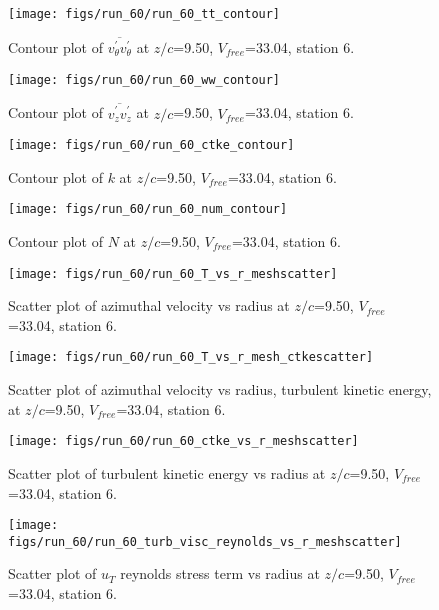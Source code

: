 \begin{figure}[H]
\centering
\texttt{[image: figs/run\_60/run\_60\_tt\_contour]}
\caption{Contour plot of $\overline{v_{\theta}^{\prime} v_{\theta}^{\prime}}$ at $z/c$=9.50, $V_{free}$=33.04, station 6.}
\end{figure}


\begin{figure}[H]
\centering
\texttt{[image: figs/run\_60/run\_60\_ww\_contour]}
\caption{Contour plot of $\overline{v_{z}^{\prime} v_{z}^{\prime}}$ at $z/c$=9.50, $V_{free}$=33.04, station 6.}
\end{figure}


\begin{figure}[H]
\centering
\texttt{[image: figs/run\_60/run\_60\_ctke\_contour]}
\caption{Contour plot of $k$ at $z/c$=9.50, $V_{free}$=33.04, station 6.}
\end{figure}


\begin{figure}[H]
\centering
\texttt{[image: figs/run\_60/run\_60\_num\_contour]}
\caption{Contour plot of $N$ at $z/c$=9.50, $V_{free}$=33.04, station 6.}
\end{figure}


\begin{figure}[H]
\centering
\texttt{[image: figs/run\_60/run\_60\_T\_vs\_r\_meshscatter]}
\caption{Scatter plot of azimuthal velocity vs radius at $z/c$=9.50, $V_{free}$=33.04, station 6.}
\end{figure}


\begin{figure}[H]
\centering
\texttt{[image: figs/run\_60/run\_60\_T\_vs\_r\_mesh\_ctkescatter]}
\caption{Scatter plot of azimuthal velocity vs radius, turbulent kinetic energy, at $z/c$=9.50, $V_{free}$=33.04, station 6.}
\end{figure}


\begin{figure}[H]
\centering
\texttt{[image: figs/run\_60/run\_60\_ctke\_vs\_r\_meshscatter]}
\caption{Scatter plot of turbulent kinetic energy vs radius at $z/c$=9.50, $V_{free}$=33.04, station 6.}
\end{figure}


\begin{figure}[H]
\centering
\texttt{[image: figs/run\_60/run\_60\_turb\_visc\_reynolds\_vs\_r\_meshscatter]}
\caption{Scatter plot of $
u_T$ reynolds stress term vs radius at $z/c$=9.50, $V_{free}$=33.04, station 6.}
\end{figure}


